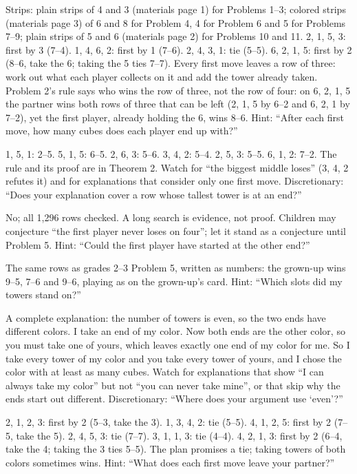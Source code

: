 Strips: plain strips of 4 and 3 (materials page 1) for Problems 1--3; colored strips (materials page 3) of 6 and 8 for Problem 4, 4 for Problem 6 and 5 for Problems 7--9; plain strips of 5 and 6 (materials page 2) for Problems 10 and 11.
 2, 1, 5, 3: first by 3 (7--4). 1, 4, 6, 2: first by 1 (7--6). 2, 4, 3, 1: tie (5--5). 6, 2, 1, 5: first by 2 (8--6, take the 6; taking the 5 ties 7--7). Every first move leaves a row of three: work out what each player collects on it and add the tower already taken. Problem 2's rule says who wins the row of three, not the row of four: on 6, 2, 1, 5 the partner wins both rows of three that can be left (2, 1, 5 by 6--2 and 6, 2, 1 by 7--2), yet the first player, already holding the 6, wins 8--6. Hint: ``After each first move, how many cubes does each player end up with?''

 1, 5, 1: 2--5. 5, 1, 5: 6--5. 2, 6, 3: 5--6. 3, 4, 2: 5--4. 2, 5, 3: 5--5. 6, 1, 2: 7--2. The rule and its proof are in Theorem 2. Watch for ``the biggest middle loses'' (3, 4, 2 refutes it) and for explanations that consider only one first move. Discretionary: ``Does your explanation cover a row whose tallest tower is at an end?''

 No; all 1,296 rows checked. A long search is evidence, not proof. Children may conjecture ``the first player never loses on four''; let it stand as a conjecture until Problem 5. Hint: ``Could the first player have started at the other end?''

 The same rows as grades 2--3 Problem 5, written as numbers: the grown-up wins 9--5, 7--6 and 9--6, playing as on the grown-up's card. Hint: ``Which slots did my towers stand on?''

 A complete explanation: the number of towers is even, so the two ends have different colors. I take an end of my color. Now both ends are the other color, so you must take one of yours, which leaves exactly one end of my color for me. So I take every tower of my color and you take every tower of yours, and I chose the color with at least as many cubes. Watch for explanations that show ``I can always take my color'' but not ``you can never take mine'', or that skip why the ends start out different. Discretionary: ``Where does your argument use `even'?''

 2, 1, 2, 3: first by 2 (5--3, take the 3). 1, 3, 4, 2: tie (5--5). 4, 1, 2, 5: first by 2 (7--5, take the 5). 2, 4, 5, 3: tie (7--7). 3, 1, 1, 3: tie (4--4). 4, 2, 1, 3: first by 2 (6--4, take the 4; taking the 3 ties 5--5). The plan promises a tie; taking towers of both colors sometimes wins. Hint: ``What does each first move leave your partner?''

